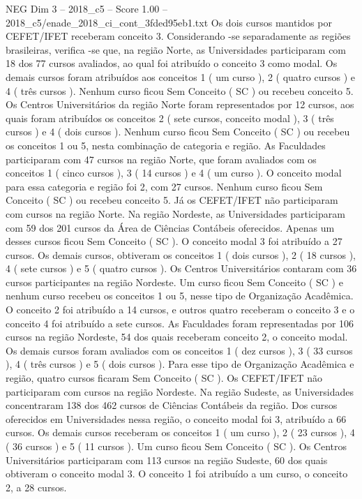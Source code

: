 \begin{textsample}{NEG Dim 3 – 2018\_c5 – Score 1.00 – 2018\_c5/enade\_2018\_ci\_cont\_3fded95eb1.txt}
Os dois cursos mantidos por CEFET/IFET receberam conceito 3.
Considerando -se separadamente as regiões brasileiras, verifica -se que, na região Norte, as Universidades participaram com 18 dos 77 cursos avaliados, ao qual foi atribuído o conceito 3 como modal.
Os demais cursos foram atribuídos aos conceitos 1 ( um curso ), 2 ( quatro cursos ) e 4 ( três cursos ).
Nenhum curso ficou Sem Conceito ( SC ) ou recebeu conceito 5.
Os Centros Universitários da região Norte foram representados por 12 cursos, aos quais foram atribuídos os conceitos 2 ( sete cursos, conceito modal ), 3 ( três cursos ) e 4 ( dois cursos ).
Nenhum curso ficou Sem Conceito ( SC ) ou recebeu os conceitos 1 ou 5, nesta combinação de categoria e região.
As Faculdades participaram com 47 cursos na região Norte, que foram avaliados com os conceitos 1 ( cinco cursos ), 3 ( 14 cursos ) e 4 ( um curso ).
O conceito modal para essa categoria e região foi 2, com 27 cursos.
Nenhum curso ficou Sem Conceito ( SC ) ou recebeu conceito 5.
Já os CEFET/IFET não participaram com cursos na região Norte.
Na região Nordeste, as Universidades participaram com 59 dos 201 cursos da Área de Ciências Contábeis oferecidos.
Apenas um desses cursos ficou Sem Conceito ( SC ).
O conceito modal 3 foi atribuído a 27 cursos.
Os demais cursos, obtiveram os conceitos 1 ( dois cursos ), 2 ( 18 cursos ), 4 ( sete cursos ) e 5 ( quatro cursos ).
Os Centros Universitários contaram com 36 cursos participantes na região Nordeste.
Um curso ficou Sem Conceito ( SC ) e nenhum curso recebeu os conceitos 1 ou 5, nesse tipo de Organização Acadêmica.
O conceito 2 foi atribuído a 14 cursos, e outros quatro receberam o conceito 3 e o conceito 4 foi atribuído a sete cursos.
As Faculdades foram representadas por 106 cursos na região Nordeste, 54 dos quais receberam conceito 2, o conceito modal.
Os demais cursos foram avaliados com os conceitos 1 ( dez cursos ), 3 ( 33 cursos ), 4 ( três cursos ) e 5 ( dois cursos ).
Para esse tipo de Organização Acadêmica e região, quatro cursos ficaram Sem Conceito ( SC ).
Os CEFET/IFET não participaram com cursos na região Nordeste.
Na região Sudeste, as Universidades concentraram 138 dos 462 cursos de Ciências Contábeis da região.
Dos cursos oferecidos em Universidades nessa região, o conceito modal foi 3, atribuído a 66 cursos.
Os demais cursos receberam os conceitos 1 ( um curso ), 2 ( 23 cursos ), 4 ( 36 cursos ) e 5 ( 11 cursos ).
Um curso ficou Sem Conceito ( SC ).
Os Centros Universitários participaram com 113 cursos na região Sudeste, 60 dos quais obtiveram o conceito modal 3.
O conceito 1 foi atribuído a um curso, o conceito 2, a 28 cursos.

\end{textsample}
